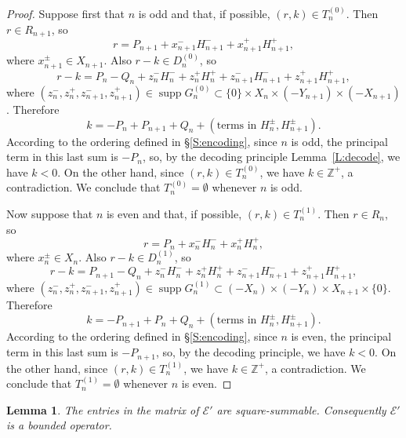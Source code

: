 \documentclass[11pt,reqno]{amsart}
\theoremstyle{plain}
\newtheorem{lemma}[theorem]{Lemma}
\theoremstyle{definition}
\theoremstyle{remark}
\newcommand{\cE}{\mathcal{E}}
\newcommand{\ZZ}{\mathbb{Z}}
\DeclareMathOperator{\supp}{supp}
\begin{document}
\begin{proof}
Suppose first that $n$ is odd and that, if possible, $(r,k)\in T_n^{(0)}$.
Then $r\in R_{n+1}$, so
\[
r=P_{n+1}+x_{n+1}^-H_{n+1}^-+x_{n+1}^+H_{n+1}^+,
\]
where $x_{n+1}^\pm\in X_{n+1}$. Also $r-k\in D_n^{(0)}$, so
\[
r-k=P_n-Q_n+z_n^-H_n^-+z_n^+H_n^++z_{n+1}^-H_{n+1}^-+z_{n+1}^+H_{n+1}^+,
\]
where $(z_n^-,z_n^+,z_{n+1}^-,z_{n+1}^+)\in\supp G_n^{(0)}
\subset \{0\}\times X_n\times(-Y_{n+1})\times(-X_{n+1})$.
Therefore
\[
k=-P_n+P_{n+1}+Q_n+ (\text{terms in~} H_n^\pm,H_{n+1}^\pm).
\]
According to the ordering defined in \S\ref{S:encoding},
since $n$ is odd, the principal term in this last sum is $-P_n$,
so, by the decoding principle Lemma~\ref{L:decode}, we have $k<0$.
On the other hand, since $(r,k)\in T_n^{(0)}$, we have $k\in \ZZ^+$,
a contradiction.
We conclude that
 $T_n^{(0)}=\emptyset$ whenever $n$ is odd.

Now suppose  that $n$ is even and that, if possible, $(r,k)\in T_n^{(1)}$.
Then $r\in R_{n}$, so
\[
r=P_{n}+x_{n}^-H_{n}^-+x_{n}^+H_{n}^+,
\]
where $x_{n}^\pm\in X_{n}$. Also $r-k\in D_n^{(1)}$, so
\[
r-k=P_{n+1}-Q_n+z_n^-H_n^-+z_n^+H_n^++z_{n+1}^-H_{n+1}^-+z_{n+1}^+H_{n+1}^+,
\]
where $(z_n^-,z_n^+,z_{n+1}^-,z_{n+1}^+)\in\supp G_n^{(1)}
\subset (-X_n)\times (-Y_n)\times X_{n+1}\times\{0\}$.
Therefore
\[
k=-P_{n+1}+P_{n}+Q_n+ (\text{terms in~} H_n^\pm,H_{n+1}^\pm).
\]
According to the ordering defined in \S\ref{S:encoding},
since $n$ is even, the principal term in this last sum is $-P_{n+1}$,
so, by the decoding principle, we have $k<0$. On the other hand, since $(r,k)\in T_n^{(1)}$, we have $k\in \ZZ^+$,
a contradiction. We conclude that $T_n^{(1)}=\emptyset$
whenever $n$ is even.
\end{proof}

\begin{lemma}\label{L:cE'bounded}
The entries in the matrix of $\cE'$ are square-summable.
Consequently $\cE'$ is a bounded operator.
\end{lemma}
\end{document}
